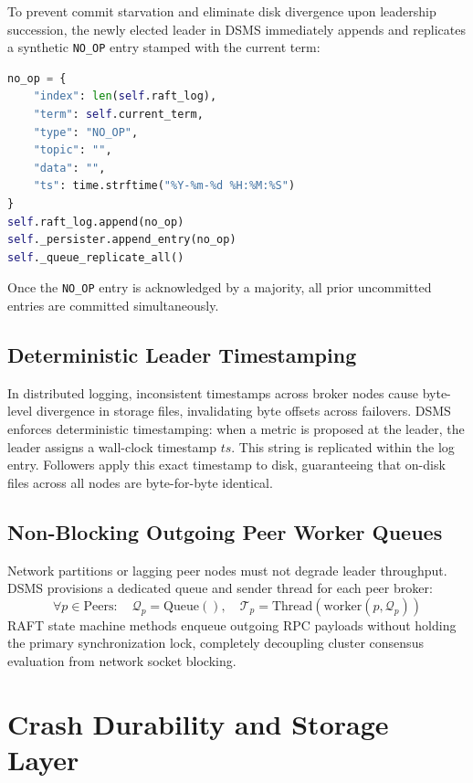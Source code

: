 \documentclass[11pt,a4paper]{article}
\begin{document}
To prevent commit starvation and eliminate disk divergence upon leadership succession, the newly elected leader in DSMS immediately appends and replicates a synthetic \texttt{NO\_OP} entry stamped with the current term:
\begin{lstlisting}[language=Python]
no_op = {
    "index": len(self.raft_log),
    "term": self.current_term,
    "type": "NO_OP",
    "topic": "",
    "data": "",
    "ts": time.strftime("%Y-%m-%d %H:%M:%S")
}
self.raft_log.append(no_op)
self._persister.append_entry(no_op)
self._queue_replicate_all()
\end{lstlisting}
Once the \texttt{NO\_OP} entry is acknowledged by a majority, all prior uncommitted entries are committed simultaneously.

\subsection{Deterministic Leader Timestamping}
In distributed logging, inconsistent timestamps across broker nodes cause byte-level divergence in storage files, invalidating byte offsets across failovers. DSMS enforces deterministic timestamping: when a metric is proposed at the leader, the leader assigns a wall-clock timestamp $ts$. This string is replicated within the log entry. Followers apply this exact timestamp to disk, guaranteeing that on-disk files across all nodes are byte-for-byte identical.

\subsection{Non-Blocking Outgoing Peer Worker Queues}
Network partitions or lagging peer nodes must not degrade leader throughput. DSMS provisions a dedicated queue and sender thread for each peer broker:
\begin{equation}
\forall p \in \text{Peers}: \quad \mathcal{Q}_p = \text{Queue}(), \quad \mathcal{T}_p = \text{Thread}(\text{worker}(p, \mathcal{Q}_p))
\end{equation}
RAFT state machine methods enqueue outgoing RPC payloads without holding the primary synchronization lock, completely decoupling cluster consensus evaluation from network socket blocking.

\section{Crash Durability and Storage Layer}
\label{sec:storage}
\end{document}
